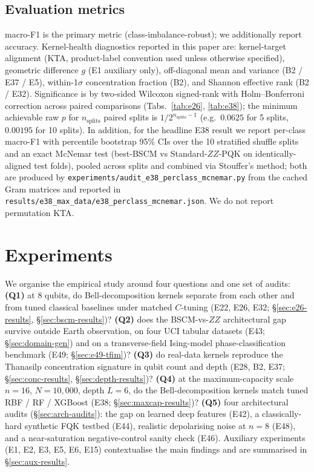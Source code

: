 \documentclass[pdflatex,sn-mathphys]{sn-jnl}
\theoremstyle{plain}
\theoremstyle{remark}
\theoremstyle{definition}
\begin{document}
\subsection{Evaluation metrics}
macro-F1 is the primary metric (class-imbalance-robust); we additionally report accuracy.  Kernel-health diagnostics reported in this paper are: kernel-target alignment (KTA, product-label convention used unless otherwise specified), geometric difference $g$ \cite{huang2021} (E1 auxiliary only), off-diagonal mean and variance (B2 / E37 / E5), within-1$\sigma$ concentration fraction (B2), and Shannon effective rank (B2 / E32).  Significance is by two-sided Wilcoxon signed-rank with Holm--Bonferroni correction across paired comparisons (Tabs.~\ref{tab:e26}, \ref{tab:e38}); the minimum achievable raw $p$ for $n_{\text{splits}}$ paired splits is $1/2^{n_{\text{splits}}-1}$ (e.g.\ $0.0625$ for 5 splits, $0.00195$ for 10 splits).  In addition, for the headline E38 result we report per-class macro-F1 with percentile bootstrap 95\% CIs over the 10 stratified shuffle splits and an exact McNemar test (best-BSCM vs Standard-$ZZ$-PQK on identically-aligned test folds), pooled across splits and combined via Stouffer's method; both are produced by \texttt{experiments/audit\_e38\_perclass\_mcnemar.py} from the cached Gram matrices and reported in \texttt{results/e38\_max\_data/e38\_perclass\_mcnemar.json}.  We do not report permutation KTA.

\section{Experiments}\label{sec:experiments}

We organise the empirical study around four questions and one set of audits: \textbf{(Q1)} at 8 qubits, do Bell-decomposition kernels separate from each other and from tuned classical baselines under matched $C$-tuning (E22, E26, E32; \S\ref{sec:e26-results}, \S\ref{sec:bscm-results})?  \textbf{(Q2)} does the BSCM-vs-$ZZ$ architectural gap survive outside Earth observation, on four UCI tabular datasets (E43; \S\ref{sec:domain-gen}) and on a transverse-field Ising-model phase-classification benchmark (E49; \S\ref{sec:e49-tfim})?  \textbf{(Q3)} do real-data kernels reproduce the Thanasilp concentration signature in qubit count and depth (E28, B2, E37; \S\ref{sec:conc-results}, \S\ref{sec:depth-results})?  \textbf{(Q4)} at the maximum-capacity scale $n=16$, $N=10{,}000$, depth $L=6$, do the Bell-decomposition kernels match tuned RBF / RF / XGBoost (E38; \S\ref{sec:maxcap-results})?  \textbf{(Q5)} four architectural audits (\S\ref{sec:arch-audits}): the gap on learned deep features (E42), a classically-hard synthetic FQK testbed (E44), realistic depolarising noise at $n=8$ (E48), and a near-saturation negative-control sanity check (E46).  Auxiliary experiments (E1, E2, E3, E5, E6, E15) contextualise the main findings and are summarised in \S\ref{sec:aux-results}.
\end{document}
